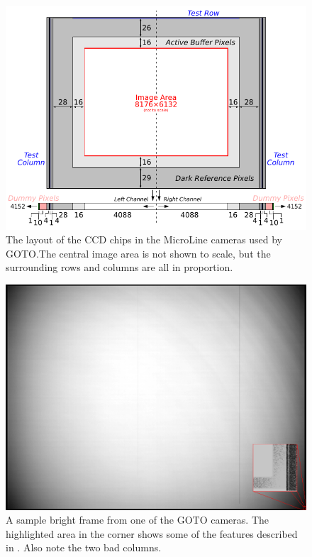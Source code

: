 \begin{colsection}
\begin{colsection}
\begin{figure}[p]
    \begin{center}
        \includegraphics[width=\textwidth]{images/chip}
    \end{center}
    \caption[The layout of the CCD chips in the MicroLine cameras used by GOTO]{
        The layout of the CCD chips in the MicroLine cameras used by GOTO.\@ The central image area is not shown to scale, but the surrounding rows and columns are all in proportion.
        }\label{fig:chip}
\end{figure}

\begin{figure}[p]
    \begin{center}
        \includegraphics[width=\textwidth]{images/sample.png}
    \end{center}
    \caption[TODO]{
        A sample bright frame from one of the GOTO cameras. The highlighted area in the corner shows some of the features described in . Also note the two bad columns.
        }\label{fig:frame}
\end{figure}


\end{colsection}
\end{colsection}
